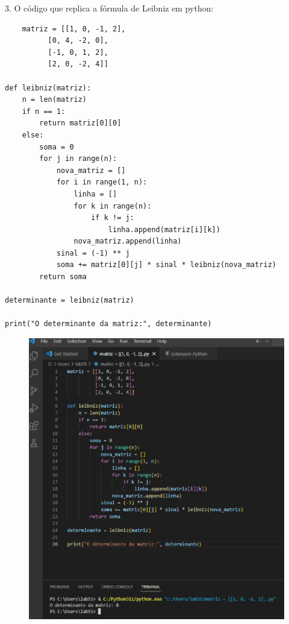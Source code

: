 \documentclass{article}
\begin{document}
3. O código que replica a fórmula de Leibniz em python:

\begin{lstlisting}
    matriz = [[1, 0, -1, 2],
          [0, 4, -2, 0],
          [-1, 0, 1, 2],
          [2, 0, -2, 4]]

def leibniz(matriz):
    n = len(matriz)
    if n == 1:
        return matriz[0][0]
    else:
        soma = 0
        for j in range(n):
            nova_matriz = []
            for i in range(1, n):
                linha = []
                for k in range(n):
                    if k != j:
                        linha.append(matriz[i][k])
                nova_matriz.append(linha)
            sinal = (-1) ** j
            soma += matriz[0][j] * sinal * leibniz(nova_matriz)
        return soma

determinante = leibniz(matriz)

print("O determinante da matriz:", determinante)
\end{lstlisting}

\begin{figure}
    \centering
    \includegraphics{fotocerta.png}
    \label{fig:my_label}
\end{figure}
\end{document}
